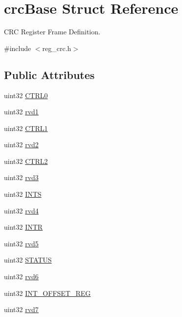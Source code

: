 \hypertarget{structcrcBase}{}\section{crc\+Base Struct Reference}
\label{structcrcBase}


C\+RC Register Frame Definition.  




{\ttfamily \#include $<$reg\+\_\+crc.\+h$>$}

\subsection*{Public Attributes}
\begin{DoxyCompactItemize}
\item 
uint32 \mbox{\hyperlink{structcrcBase_a797eadcec3496b227d91dac1f1c55fb1}{C\+T\+R\+L0}}
\item 
uint32 \mbox{\hyperlink{structcrcBase_a5a8f9d67607b304364cb0748a1ca8f3b}{rvd1}}
\item 
uint32 \mbox{\hyperlink{structcrcBase_ac1edaba6b81f38ff261f159e9d08e2b0}{C\+T\+R\+L1}}
\item 
uint32 \mbox{\hyperlink{structcrcBase_a7b3464c084860914aa88d19e7d1898fe}{rvd2}}
\item 
uint32 \mbox{\hyperlink{structcrcBase_acf54f627cfefd21ff903d53c30e1d05c}{C\+T\+R\+L2}}
\item 
uint32 \mbox{\hyperlink{structcrcBase_a1d38774cc9aeabd8c31f72e1e408585a}{rvd3}}
\item 
uint32 \mbox{\hyperlink{structcrcBase_aa34bf73c1f563f14193980b86c2c3096}{I\+N\+TS}}
\item 
uint32 \mbox{\hyperlink{structcrcBase_af656995e433df006f9d3b42bbeceb635}{rvd4}}
\item 
uint32 \mbox{\hyperlink{structcrcBase_a66390a9757b3a9f1681bd825f108fad3}{I\+N\+TR}}
\item 
uint32 \mbox{\hyperlink{structcrcBase_a556e9011fd05042a90970e513471e569}{rvd5}}
\item 
uint32 \mbox{\hyperlink{structcrcBase_a07e171ce6b8bcf212cb90dced2a3842c}{S\+T\+A\+T\+US}}
\item 
uint32 \mbox{\hyperlink{structcrcBase_ac696dc57ad991726fb62af8521a8dc1d}{rvd6}}
\item 
uint32 \mbox{\hyperlink{structcrcBase_a162e7d1ff1556ca613ea9e9bebb7c3f1}{I\+N\+T\+\_\+\+O\+F\+F\+S\+E\+T\+\_\+\+R\+EG}}
\item 
uint32 \mbox{\hyperlink{structcrcBase_a0d066ff068caa96d66661653383a5501}{rvd7}}

\end{DoxyCompactItemize}
